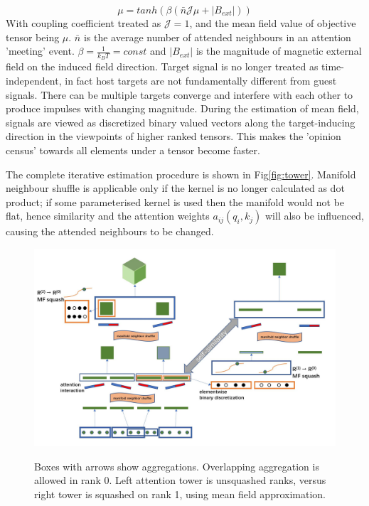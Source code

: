 \documentclass[11pt,a4paper]{article}
\begin{document}
\begin{multicols}{2}
  \begin{equation}
    \mu = tanh\left( \beta(\bar{n}\mathcal{J} \mu + |B_{ext}|) \right)
    \label{MF2}
  \end{equation}
  With coupling coefficient treated as $\mathcal{J}=1$, and the mean field value of objective tensor being $\mu$. 
  $\bar{n}$ is the average number of attended neighbours in an attention 'meeting' event. $\beta=\frac{1} {k_BT}=const$ and $|B_{ext}|$ is the magnitude of magnetic external field on the induced field direction. 
  Target signal is no longer treated as time-independent, in fact host targets are not fundamentally different from guest signals. There can be multiple targets converge and interfere with each other to produce impulses with changing magnitude.
  During the estimation of mean field, signals are viewed as discretized binary valued vectors along the target-inducing direction in the viewpoints of higher ranked tensors. 
  This makes the 'opinion census' towards all elements under a tensor become faster.

  The complete iterative estimation procedure is shown in Fig\eqref{fig:tower}. Manifold neighbour shuffle is applicable only if the kernel is no longer calculated as dot product; 
  if some parameterised kernel is used then the manifold would not be flat, hence similarity and the attention weights $a_{ij}(q_i, k_j)$ will also be influenced, causing the attended neighbours to be changed. 

\end{multicols}

\begin{figure}[bth]
  {\includegraphics[width=1.0\linewidth]{fig/tower}}
  \caption{Boxes with arrows show aggregations. Overlapping aggregation is allowed in rank 0. Left attention tower is unsquashed ranks, versus right tower is squashed on rank 1, using mean field approximation.}\label{fig:tower}
\end{figure}
\end{document}
